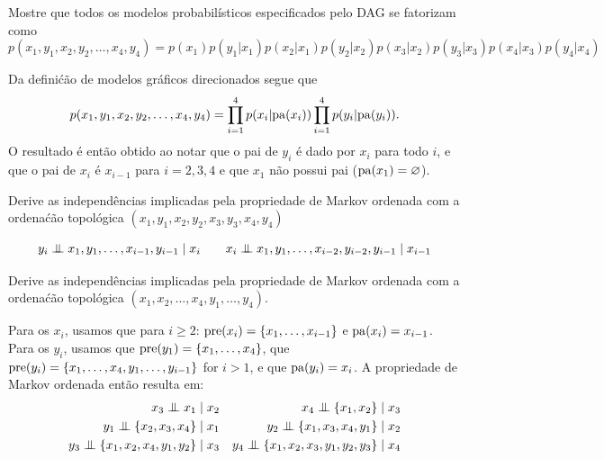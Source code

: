 \begin{exenumerate}
    \item Mostre que todos os modelos probabil\'isticos especificados pelo DAG se fatorizam como
    $$p(x_1,y_1, x_2, y_2, \ldots,x_4,y_4) = p(x_1)p(y_1|x_1)p(x_2 | x_1)p(y_2|x_2)p(x_3|x_2)p(y_3|x_3)p(x_4|x_3)p(y_4|x_4)$$
    \begin{solution}
        Da defini\'c\~ao de modelos gr\'aficos direcionados segue que
        $$p(x_1,y_1, x_2, y_2, \ldots,x_4,y_4) = \prod_{i=1}^4 p(x_i |
        \mathrm{pa}(x_i)) \prod_{i=1}^4 p(y_i | \mathrm{pa}(y_i)).$$ O resultado \'e ent\~ao
        obtido ao notar que o pai de $y_i$ \'e dado por $x_i$ para todo $i$,
        e que o pai de $x_i$ \'e $x_{i-1}$ para $i=2,3,4$ e que $x_1$ n\~ao possui pai ($\mathrm{pa}(x_1) = \varnothing$).
    \end{solution}
    \item Derive as independ\^encias implicadas pela propriedade de Markov ordenada com a ordena\'c\~ao topol\'ogica $(x_1, y_1, x_2, y_2, x_3, y_3, x_4, y_4)$
    
    \begin{solution}
        $$y_i \mathrel{\perp\mspace{-10mu}\perp} x_1, y_1, \ldots, x_{i-1}, y_{i-1} \mid x_i \quad \quad x_i \mathrel{\perp\mspace{-10mu}\perp} x_1, y_1, \ldots, x_{i-2},y_{i-2},y_{i-1} \mid x_{i-1}$$
        
    \end{solution}
    
    \item Derive as independ\^encias implicadas pela propriedade de Markov ordenada com a ordena\'c\~ao topol\'ogica $(x_1, x_2, \ldots, x_4, y_1, \ldots, y_4)$.
    \begin{solution} Para os $x_i$, usamos que para $i \ge 2$: $\mathrm{pre}(x_i) = \{x_1, \ldots, x_{i-1}\}$ e $\mathrm{pa}(x_i) = x_{i-1}$. Para os $y_i$, usamos que
        $\mathrm{pre}(y_1) = \{x_1,\ldots, x_4\}$, que $\mathrm{pre}(y_i) = \{x_1,\ldots, x_4, y_1, \ldots, y_{i-1}\}$ for $i>1$, e que $\mathrm{pa}(y_i) = x_i$. A propriedade de Markov ordenada ent\~ao resulta em:
        \begin{align*}
            x_3 \independent x_1 \mid x_2 && x_4 \independent \{x_1,x_2\} \mid x_3\\
            y_1 \independent \{x_2, x_3, x_4\} \mid x_1 &&  y_2 \independent \{x_1, x_3, x_4, y_1\} \mid x_2 \\
            y_3 \independent \{x_1, x_2, x_4, y_1, y_2\} \mid x_3 &&  y_4 \independent \{x_1, x_2, x_3, y_1, y_2, y_3\} \mid x_4
        \end{align*}
        

\end{solution}
\end{exenumerate}
